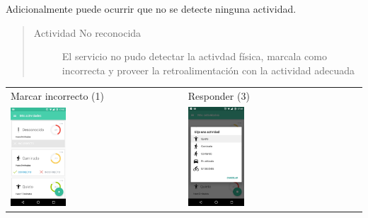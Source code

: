 {Adicionalmente puede ocurrir que no se detecte ninguna actividad.
\begin{quote}
\begin{description}
\item[{Actividad No reconocida}] \leavevmode
El servicio no pudo detectar la activdad física, marcala como incorrecta y proveer la retroalimentación
con la actividad adecuada

\end{description}
\end{quote}

\begin{table}[!htbp]
\begin{tabular}{ll}
\textsf{\relax 
Marcar incorrecto (1)
} & \textsf{\relax 
Responder (3)
}\\
    {\includegraphics[width=0.33\textwidth]{anexos/graphics/act_nook_unk.jpg}}
 & 
    {\includegraphics[width=0.33\textwidth]{anexos/graphics/act_feed.jpg}}
\\
\end{tabular}
\end{table}


}
